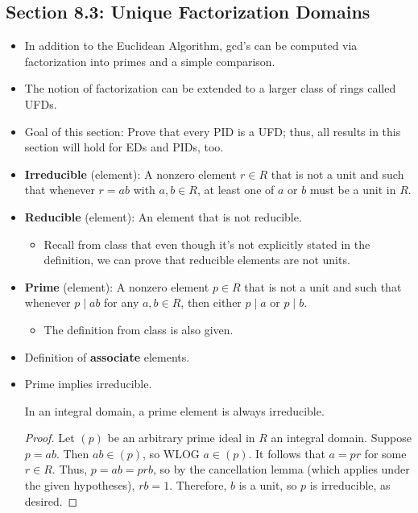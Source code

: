 \documentclass[../notes.tex]{subfiles}
\begin{document}
\subsection*{Section 8.3: Unique Factorization Domains}
\begin{itemize}
    \item {}In addition to the Euclidean Algorithm, gcd's can be computed via factorization into primes and a simple comparison.
    \item The notion of factorization can be extended to a larger class of rings called UFDs.
    \item Goal of this section: Prove that every PID is a UFD; thus, all results in this section will hold for EDs and PIDs, too.
    \item \textbf{Irreducible} (element): A nonzero element $r\in R$ that is not a unit and such that whenever $r=ab$ with $a,b\in R$, at least one of $a$ or $b$ must be a unit in $R$.
    \item \textbf{Reducible} (element): An element that is not reducible.
    \begin{itemize}
        \item Recall from class that even though it's not explicitly stated in the definition, we can prove that reducible elements are not units.
    \end{itemize}
    \item \textbf{Prime} (element): A nonzero element $p\in R$ that is not a unit and such that whenever $p\mid ab$ for any $a,b\in R$, then either $p\mid a$ or $p\mid b$.
    \begin{itemize}
        \item The definition from class is also given.
    \end{itemize}
    \item Definition of \textbf{associate} elements.
    \item Prime implies irreducible.
    \begin{proposition}\label{prp:8.10}
        In an integral domain, a prime element is always irreducible.
        \begin{proof}
            Let $(p)$ be an arbitrary prime ideal in $R$ an integral domain. Suppose $p=ab$. Then $ab\in(p)$, so WLOG $a\in(p)$. It follows that $a=pr$ for some $r\in R$. Thus, $p=ab=prb$, so by the cancellation lemma (which applies under the given hypotheses), $rb=1$. Therefore, $b$ is a unit, so $p$ is irreducible, as desired.
        \end{proof}

\end{proposition}
\end{itemize}
\end{document}
